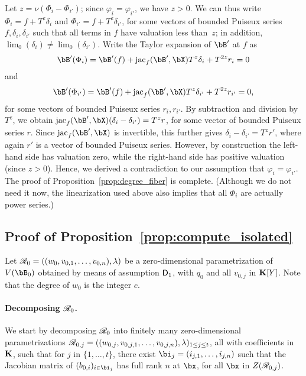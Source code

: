 \documentclass[12pt]{article}
\begin{document}
Let $z=\nu(\Phi_i-\Phi_{i'})$; since  $\varphi_i = \varphi_{i'}$, we have
$z > 0$. We can thus write $\Phi_i=f + T^z
\delta_i$ and $\Phi_{i'}=f + T^z \delta_{i'}$, for some vectors of
bounded Puiseux series $f, \delta_i, \delta_{i'}$ such that all terms
in $f$ have valuation less than~$z$; in addition, $\lim_0(\delta_i)
\ne \lim_0(\delta_{i'})$. Write the Taylor expansion of $\bB'$ at $f$ as
$$\bB'(\Phi_i) = \bB'(f) + \jac_f(\bB',\bX) T^z \delta_i + T^{2z} r_i =0$$
and
$$\bB'(\Phi_{i'}) = \bB'(f) + \jac_f(\bB',\bX) T^z \delta_{i'} + T^{2z}
r_{i'} =0,$$ for some vectors of bounded Puiseux series $r_i,r_{i'}$.
By subtraction and division by $T^z$, we obtain $\jac_f(\bB',\bX)
(\delta_i-\delta_{i'}) = T^z r$, for some vector of bounded Puiseux
series $r$.  Since $\jac_f(\bB',\bX)$ is invertible, this further gives
$\delta_i-\delta_{i'} = T^z r'$, where again $r'$ is a vector of
bounded Puiseux series.  However, by construction the left-hand side
has valuation zero, while the right-hand side has positive valuation
(since $z > 0$). Hence, we derived a contradiction to our assumption
that $\varphi_i = \varphi_{i'}$. The proof of Proposition~\ref{prop:degree_fiber} is
complete. (Although we do not need it now, the linearization
used above also implies that all $\Phi_i$ are actually power series.)


\subsection{Proof of Proposition~\ref{prop:compute_isolated}} \label{proof:prop2}

Let $\mathscr{R}_0 =((w_{0},v_{0,1},\dots,v_{0,n}),\lambda)$ be a
zero-dimensional parametrization of $V(\bB_{0})$ obtained by means of
assumption $\mathsf{D}_1$, with $q_0$ and all $v_{0,j}$ in $\mathbf{K}[Y]$. Note
that the degree of $w_0$ is the integer $c$.

\paragraph{Decomposing $\mathscr{R}_0$.}
We start by decomposing $\mathscr{R}_0$ into finitely many zero-dimensional
parametrizations
$\mathscr{R}_{0,j}=((w_{0,j},v_{0,j,1},\dots,v_{0,j,n}),\lambda)_{1\le j\le
  t}$, all with coefficients in $\mathbf{K}$, such that for $j$ in
$\{1,\dots,t\}$, there exist $\bi_j=(i_{j,1},\dots,i_{j,n})$ such that
the Jacobian matrix of $(b_{0,i})_{i \in \bi_j}$ has full rank $n$ at
$\bx$, for all $\bx$ in $Z(\mathscr{R}_{0,j})$.
\end{document}
